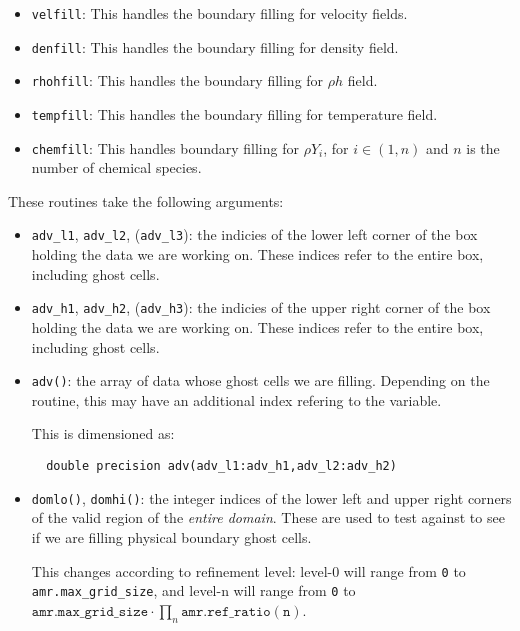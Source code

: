 \begin{itemize}
  \begin{itemize}
  \item {\tt velfill}:
    This handles the boundary filling for velocity fields.

  \item {\tt denfill}: 
    This handles the boundary filling for density field.

  \item {\tt rhohfill}: 
    This handles the boundary filling for $\rho h$ field.

  \item {\tt tempfill}: 
    This handles the boundary filling for temperature field.

  \item {\tt chemfill}: This handles boundary filling for
    $\rho Y_i$, for $i\in(1,n)$ and $n$ is the number of chemical species.

  \end{itemize}

  These routines take the following arguments:
  \begin{itemize}
  \item {\tt adv\_l1}, {\tt adv\_l2}, ({\tt adv\_l3}): the indicies of
    the lower left corner of the box holding the data we are working on.
    These indices refer to the entire box, including ghost cells.

  \item {\tt adv\_h1}, {\tt adv\_h2}, ({\tt adv\_h3}): the indicies of
    the upper right corner of the box holding the data we are working on.
    These indices refer to the entire box, including ghost cells.

  \item {\tt adv()}: the array of data whose ghost cells we are filling.
    Depending on the routine, this may have an additional index refering
    to the variable.
    
    This is dimensioned as:
\begin{verbatim}
  double precision adv(adv_l1:adv_h1,adv_l2:adv_h2)                             
\end{verbatim}

  \item {\tt domlo()}, {\tt domhi()}: the integer indices of the lower
    left and upper right corners of the valid region of the {\em entire
    domain}.  These are used to test against to see if we are filling
    physical boundary ghost cells.

    This changes according to refinement level: level-0 will
    range from {\tt 0} to {\tt amr.max\_grid\_size},
    and level-n will range from {\tt 0} to
    $\mathtt{amr.max\_grid\_size} \cdot \prod_n \mathtt{amr.ref\_ratio(n)}$.


\end{itemize}
\end{itemize}
